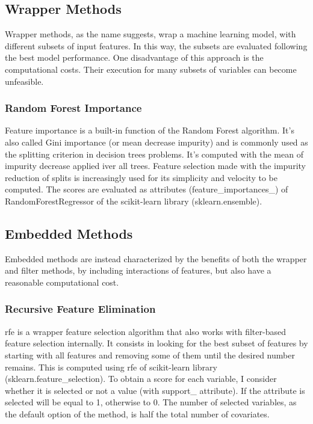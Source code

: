 \subsection{Wrapper Methods}
Wrapper methods, as the name suggests, wrap a machine learning model, with different subsets of input features. In this way, the subsets are evaluated following the best model performance.
One disadvantage of this approach is the computational costs.\newline
Their execution for many subsets of variables can become unfeasible. 
\bigbreak
\subsubsection{Random Forest Importance}
Feature importance is a built-in function of the Random Forest algorithm. It's also called Gini importance (or mean decrease impurity) and is commonly used as the splitting criterion in decision trees problems. 
It's computed with the mean of impurity decrease applied iver all trees.  
Feature selection made with the impurity reduction of splits is increasingly used for its simplicity and velocity to be computed.
The scores are evaluated as attributes (feature\_importances\_) of RandomForestRegressor of the scikit-learn library (sklearn.ensemble).
\bigbreak\bigbreak\bigbreak
\subsection{Embedded Methods}
Embedded methods are instead characterized by the benefits of both the wrapper and filter methods, by including interactions of features, but also have a reasonable computational cost.\par
\bigskip
\subsubsection{Recursive Feature Elimination}
\gls{rfe} is a wrapper feature selection algorithm that also works with filter-based feature selection internally.\newline
It consists in looking for the best subset of features by starting with all features and removing some of them until the desired number remains.\newline
This is computed using \acrshort{rfe} of scikit-learn library (sklearn.feature\_selection).
To obtain a score for each variable, I consider whether it is selected or not a value (with support\_ attribute).
If the attribute is selected will be equal to 1, otherwise to 0.
The number of selected variables, as the default option of the method, is half the total number of covariates.
\pagebreak
